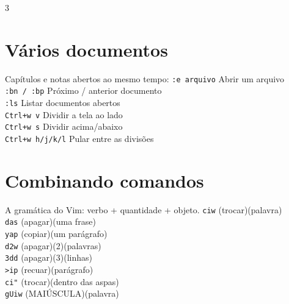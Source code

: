 \documentclass[10pt,a4paper]{article}
\newcommand{\key}[1]{{\small\texttt{#1}}}
\newcommand{\desc}[1]{{\small #1}}
\newcommand{\K}[2]{\key{#1} \hfill \desc{#2}\\[1.5pt]}
\begin{document}
\begin{multicols}{3}
\section{V\'arios documentos}
\desc{Cap\'itulos e notas abertos ao mesmo tempo:}
\vspace{3pt}
\K{:e arquivo}{Abrir um arquivo}
\K{:bn / :bp}{Pr\'oximo / anterior documento}
\K{:ls}{Listar documentos abertos}
\K{Ctrl+w v}{Dividir a tela ao lado}
\K{Ctrl+w s}{Dividir acima/abaixo}
\K{Ctrl+w h/j/k/l}{Pular entre as divis\~oes}

\section{Combinando comandos}
\desc{A gram\'atica do Vim: verbo + quantidade + objeto.}
\vspace{3pt}
\K{ciw}{(trocar)(palavra)}
\K{das}{(apagar)(uma frase)}
\K{yap}{(copiar)(um par\'agrafo)}
\K{d2w}{(apagar)(2)(palavras)}
\K{3dd}{(apagar)(3)(linhas)}
\K{>ip}{(recuar)(par\'agrafo)}
\K{ci"}{(trocar)(dentro das aspas)}
\K{gUiw}{(MAI\'USCULA)(palavra)}

\end{multicols}
\end{document}
